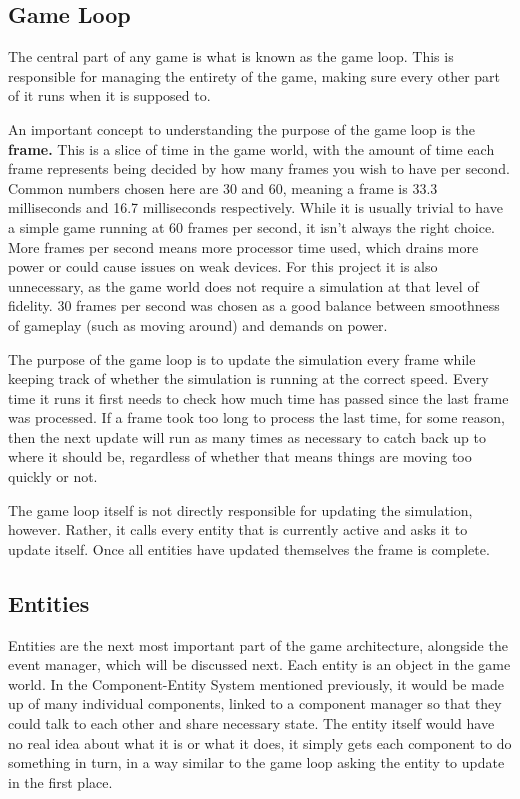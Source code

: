 
\subsection{Game Loop}
The central part of any game is what is known as the game loop. This is responsible for managing the entirety of the game, making sure every other part of it runs when it is supposed to.

An important concept to understanding the purpose of the game loop is the \textbf{frame.} This is a slice of time in the game world, with the amount of time each frame represents being decided by how many frames you wish to have per second. Common numbers chosen here are 30 and 60, meaning a frame is 33.3 milliseconds and 16.7 milliseconds respectively. While it is usually trivial to have a simple game running at 60 frames per second, it isn't always the right choice. More frames per second means more processor time used, which drains more power or could cause issues on weak devices. For this project it is also unnecessary, as the game world does not require a simulation at that level of fidelity. 30 frames per second was chosen as a good balance between smoothness of gameplay (such as moving around) and demands on power.

The purpose of the game loop is to update the simulation every frame while keeping track of whether the simulation is running at the correct speed. Every time it runs it first needs to check how much time has passed since the last frame was processed. If a frame took too long to process the last time, for some reason, then the next update will run as many times as necessary to catch back up to where it should be, regardless of whether that means things are moving too quickly or not.

The game loop itself is not directly responsible for updating the simulation, however. Rather, it calls every entity that is currently active and asks it to update itself. Once all entities have updated themselves the frame is complete.

\subsection{Entities}
Entities are the next most important part of the game architecture, alongside the event manager, which will be discussed next. Each entity is an object in the game world. In the Component-Entity System mentioned previously, it would be made up of many individual components, linked to a component manager so that they could talk to each other and share necessary state. The entity itself would have no real idea about what it is or what it does, it simply gets each component to do something in turn, in a way similar to the game loop asking the entity to update in the first place.

